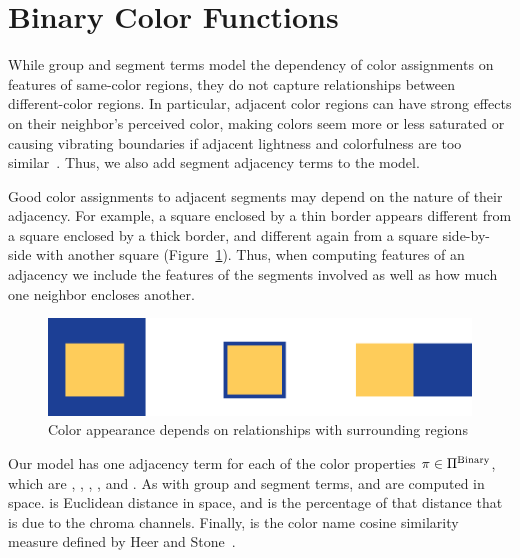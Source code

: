 \section{Binary Color Functions}
\label{sec:binary}






While group and segment terms model the dependency of color assignments on features of same-color regions, they do not capture relationships between different-color regions. In particular, adjacent color regions can have strong effects on their neighbor's perceived color, making colors seem more or less saturated or causing vibrating boundaries if adjacent lightness and colorfulness are too similar~\cite{AlbersInteractionOfColor}. Thus, we also add segment adjacency terms to the model.

Good color assignments to adjacent segments may depend on the nature of their adjacency. For example, a square enclosed by a thin border appears different from a square enclosed by a thick border, and different again from a square side-by-side with another square (Figure~\ref{fig:surround}). Thus, when computing features of an adjacency we include the features of the segments involved as well as how much one neighbor encloses another.
\begin{figure}[ht]
\centering
\includegraphics[width=.7\columnwidth]{figs/surround}
\caption{Color appearance depends on relationships with surrounding regions}
\label{fig:surround}
\end{figure}


Our model has one adjacency term for each of the color properties $ \pi \in \Pi^{\textrm{Binary}}$, which are , , , , and .
As with group and segment terms,  and  are computed in \lab space.  is Euclidean distance in \lab space, and  is the percentage of that distance that is due to the chroma channels. Finally,  is the color name cosine similarity measure defined by Heer and Stone~.


